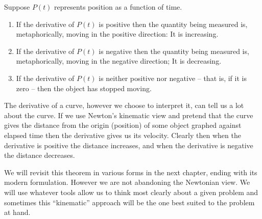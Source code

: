 \begin{mytheorem}
  Suppose $P(t)$ represents position as a function of time.
  \label{thm:FDT-Newton}
  \begin{enumerate}\label{list:FirstDerivTest-Newton}
  \item If the derivative of $P(t)$ is positive then the quantity being measured
    is, metaphorically, moving in the positive direction: It is
    increasing.
  \item If the derivative of $P(t)$ is negative then the quantity being measured
    is, metaphorically, moving in the negative direction; It is decreasing.
  \item If the derivative of $P(t)$ is neither positive nor negative -- that is,
    if it is zero -- then the object has stopped moving.
  \end{enumerate}
\end{mytheorem}

The derivative of a curve, however we choose to
interpret it, can tell us a lot about the curve. If we use Newton's
kinematic view and pretend that the curve gives the distance from the
origin (position) of some object graphed against elapsed time then the
derivative gives us its velocity. Clearly then when the derivative is
positive the distance increases, and when the derivative is negative
the distance decreases.

We will revisit this theorem in various forms in the next chapter,
ending with its modern formulation. However we are not abandoning the
Newtonian view. We will use whatever tools allow us to think most
clearly about a given problem and sometimes this ``kinematic''
approach will be the one best suited to the problem at hand.


